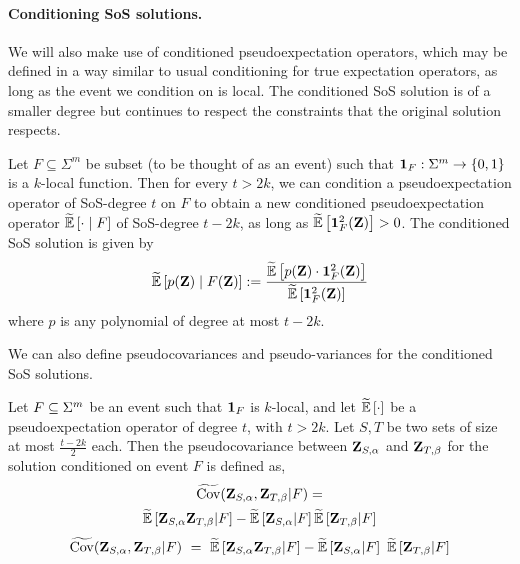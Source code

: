 \paragraph{Conditioning SoS solutions.}
%
We will also make use of conditioned pseudoexpectation operators, which may be defined in a way
similar to usual conditioning for true expectation operators, as long as the event we condition on
is local. 
%
The conditioned SoS solution is of a smaller degree but continues to respect the constraints that the original solution respects.

\begin{definition} Let $F \subseteq \Sigma^m$ be subset (to be thought of as an event) such that ${\mathbf{1}}_F:\Sigma^m \rightarrow \{0,1\}$ is a $k$-local function. Then for every $t>2k$, we can condition a pseudoexpectation operator of SoS-degree $t$ on $F$ to obtain a new conditioned pseudoexpectation operator $\condPE{\cdot}{F}$ of SoS-degree $t-2k$, as long as $\tildeEx{\one^2_F(\zee)}>0$. The conditioned SoS solution is given by
\[
	\condPE{ p(\zee)}{F(\zee) } \defeq \frac{\tildeEx{p(\zee) \cdot \one^2_{F}(\zee)}}{\tildeEx{\one^2_{F}(\zee)}}
\]
where $p$ is any polynomial of degree at most $t-2k$.
\end{definition}


We can also define pseudocovariances and pseudo-variances for the conditioned SoS solutions.
\begin{definition}[Pseudocovariance]
	Let $F\subseteq \Sigma^m$ be an event such that ${\mathbf{1}}_F$ is $k$-local, and let $\tildeEx{\cdot}$ be a pseudoexpectation operator of degree $t$, with $t>2k$. Let $S,T$ be two sets of size at most $\frac{t-2k}{2}$ each. Then the pseudocovariance between ${ \mathbf{Z} }_{S,\alpha}$ and ${ \mathbf{Z} }_{T,\beta}$ for the solution conditioned on event $F$ is defined as,
\ifnum{}
\begin{multline*}
\tildecov(\zee_{S,\alpha},\zee_{T,\beta} \vert F) = \\
\tildeEx{ \zee_{S,\alpha} \zee_{T,\beta} \vert F} - \tildeEx{\zee_{S,\alpha} \vert F} \tildeEx{\zee_{T,\beta} \vert F}
\end{multline*}
\else
\begin{align*}
\tildecov(\zee_{S,\alpha},\zee_{T,\beta} \vert F) 
~=~ \tildeEx{ \zee_{S,\alpha} \zee_{T,\beta} \vert F} - \tildeEx{\zee_{S,\alpha} \vert F} ~ \tildeEx{\zee_{T,\beta} \vert F}
\end{align*}
\fi
\end{definition}

